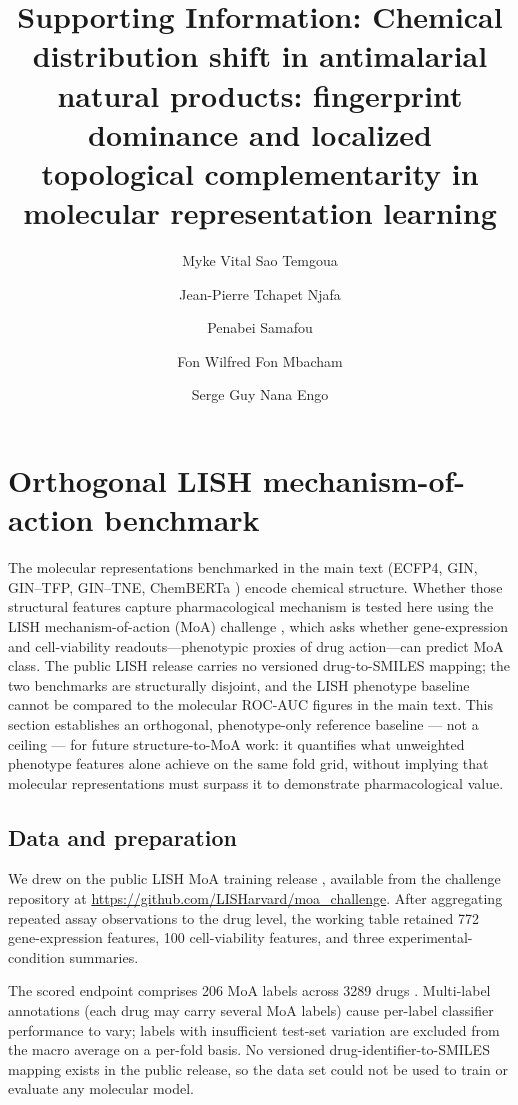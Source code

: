 \documentclass[11pt,a4paper]{article}
\title{Supporting Information: Chemical distribution shift in antimalarial natural products: fingerprint dominance and localized topological complementarity in molecular representation learning}
\author{Myke Vital Sao Temgoua \and Jean-Pierre Tchapet Njafa \and Penabei Samafou \and Fon Wilfred Fon Mbacham \and Serge Guy Nana Engo}
\date{}
\begin{document}
\maketitle

\renewcommand{\thesection}{S\arabic{section}}
\renewcommand{\thesubsection}{S\arabic{section}.\arabic{subsection}}
\renewcommand{\thetable}{S\arabic{table}}
\renewcommand{\thefigure}{S\arabic{figure}}
\renewcommand{\theequation}{S\arabic{equation}}

\section{Orthogonal LISH mechanism-of-action benchmark}
\label{sec:lish_si}

The molecular representations benchmarked in the main text (ECFP4, GIN, GIN--TFP, GIN--TNE, ChemBERTa \citep{chemberta_2020}) encode chemical structure. Whether those structural features capture pharmacological mechanism is tested here using the LISH mechanism-of-action (MoA) challenge \citep{lish_moa_2019}, which asks whether gene-expression and cell-viability readouts---phenotypic proxies of drug action---can predict MoA class. The public LISH release carries no versioned drug-to-SMILES mapping; the two benchmarks are structurally disjoint, and the LISH phenotype baseline cannot be compared to the molecular ROC-AUC figures in the main text. This section establishes an orthogonal, phenotype-only reference baseline --- not a ceiling --- for future structure-to-MoA work: it quantifies what unweighted phenotype features alone achieve on the same fold grid, without implying that molecular representations must surpass it to demonstrate pharmacological value.

\subsection{Data and preparation}

We drew on the public LISH MoA training release \citep{lish_moa_2019}, available from the challenge repository at \url{https://github.com/LISHarvard/moa_challenge}. After aggregating repeated assay observations to the drug level, the working table retained \num{772} gene-expression features, \num{100} cell-viability features, and three experimental-condition summaries.

The scored endpoint comprises \num{206} MoA labels across \num{3289} drugs \citep{Trapotsi2022MoA}. Multi-label annotations (each drug may carry several MoA labels) cause per-label classifier performance to vary; labels with insufficient test-set variation are excluded from the macro average on a per-fold basis. No versioned drug-identifier-to-SMILES mapping exists in the public release, so the data set could not be used to train or evaluate any molecular model.
\end{document}
